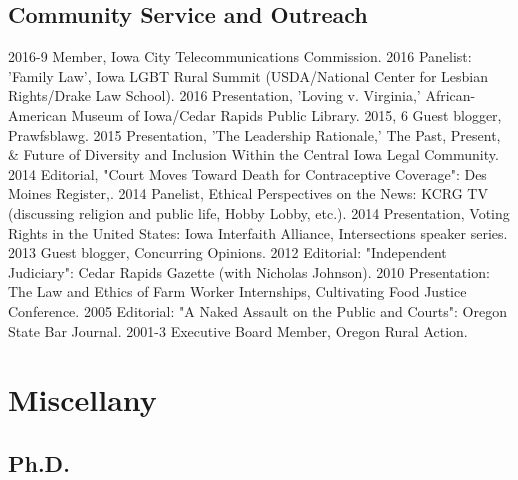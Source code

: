 \documentclass[letterpaper]{moderncv}
\begin{document}
\subsection{Community Service and Outreach}
\cvitem
{2016-9}
{Member, Iowa City Telecommunications Commission.}
\vspace{1mm}
\cvitem
{2016}
{Panelist: 'Family Law', Iowa LGBT Rural Summit (USDA/National Center for Lesbian Rights/Drake Law School).}
\vspace{1mm}
\cvitem
{2016}
{Presentation, 'Loving v. Virginia,' African-American Museum of Iowa/Cedar Rapids Public Library.}
\vspace{1mm}
\cvitem
{2015, 6}
{Guest blogger, Prawfsblawg.}
\vspace{1mm}
\cvitem
{2015}
{Presentation, 'The Leadership Rationale,' The Past, Present, \& Future of Diversity and Inclusion Within the Central Iowa Legal Community.}
\vspace{1mm}
\cvitem
{2014}
{Editorial, "Court Moves Toward Death for Contraceptive Coverage": Des Moines Register,.}
\vspace{1mm}
\cvitem
{2014}
{Panelist, Ethical Perspectives on the News: KCRG TV (discussing religion and public life, Hobby Lobby, etc.).}
\vspace{1mm}
\cvitem
{2014}
{Presentation, Voting Rights in the United States: Iowa Interfaith Alliance, Intersections speaker series.}
\vspace{1mm}
\cvitem
{2013}
{Guest blogger, Concurring Opinions.}
\vspace{1mm}
\cvitem
{2012}
{Editorial: "Independent Judiciary": Cedar Rapids Gazette (with Nicholas Johnson).}
\vspace{1mm}
\cvitem
{2010}
{Presentation: The Law and Ethics of Farm Worker Internships, Cultivating Food Justice Conference.}
\vspace{1mm}
\cvitem
{2005}
{Editorial: "A Naked Assault on the Public and Courts": Oregon State Bar Journal.}
\vspace{1mm}
\cvitem
{2001-3}
{Executive Board Member, Oregon Rural Action.}
\vspace{1mm}
% 
%
\section{Miscellany}
\subsection{Ph.D.}
\end{document}
